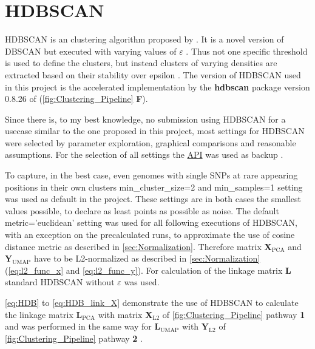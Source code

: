 \section{HDBSCAN} \label{sec:HDBSCAN}

\gls{HDBSCAN} is an clustering algorithm proposed by \textcite{campello_hierarchical_2015, hutchison_density-based_2013}. It is a novel version of \gls{DBSCAN} but executed with varying values of $\varepsilon$ \autocite{hutchison_density-based_2013}. Thus not one specific threshold is used to define the clusters, but instead clusters of varying densities are extracted based on their stability over epsilon \autocite{mcinnes_hdbscan_2017}. The version of \gls{HDBSCAN} used in this project is the accelerated implementation by the \textbf{hdbscan} package version 0.8.26 of \textcite{mcinnes_accelerated_2017} (\autoref{fig:Clustering_Pipeline} \textsf{\textbf{F}}).

Since there is, to my best knowledge, no submission using \gls{HDBSCAN} for a usecase similar to the one proposed in this project, most settings for \gls{HDBSCAN} were selected by parameter exploration, graphical comparisons and reasonable assumptions. For the selection of all settings the \href{https://hdbscan.readthedocs.io/en/latest/api.html}{API} was used as backup \autocite{mcinnes_hdbscan_2017}. 

To capture, in the best case, even genomes with single \glspl{SNP} at rare appearing positions in their own clusters \colorbox{backcolour}{min\_cluster\_size=2} and \colorbox{backcolour}{min\_samples=1} setting was used as default in the project. These settings are in both cases the smallest values possible, to declare as least points as possible as noise. The default \colorbox{backcolour}{metric='euclidean'} setting was used for all following executions of \gls{HDBSCAN}, with an exception on the precalculated runs, to approximate the use of cosine distance metric as described in \autoref{sec:Normalization}. Therefore matrix $\mathbf{X}_{\text{PCA}}$ and $\mathbf{Y}_{\text{UMAP}}$ have to be L2-normalized as described in \autoref{sec:Normalization} (\autoref{eq:l2_func_x} and \autoref{eq:l2_func_y}). For calculation of the linkage matrix $\mathbf{L}$ standard \gls{HDBSCAN} without $\varepsilon$ was used.

\autoref{eq:HDB} to \autoref{eq:HDB_link_X} demonstrate the use of \gls{HDBSCAN} to calculate the linkage matrix $\mathbf{L}_{\text{PCA}}$ with matrix $\mathbf{X}_{\text{L2}}$ of \autoref{fig:Clustering_Pipeline} pathway \textsf{\textbf{1}} and was performed in the same way for $\mathbf{L}_{\text{UMAP}}$ with $\mathbf{Y}_{\text{L2}}$ of \autoref{fig:Clustering_Pipeline} pathway \textsf{\textbf{2}} \autocite{mcinnes_hdbscan_2017, gower_minimum_1969}.

